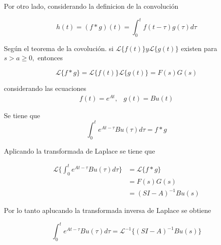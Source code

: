 Por otro lado, considerando la definicion de la convolución

\[
    h(t)=(f*g)(t) = \int_{0}^{t} f(t-\tau)g(\tau)d\tau 
\]

Según el teorema de la covolución. si \( \mathcal{L} \{ f(t) \} y \mathcal{L} \{g(t)\} \) existen para \( s>a\geq 0, \) entonces

\[
    \mathcal{L} \{f* g\} = \mathcal{L} \{ f(t) \} \mathcal{L} \{ g(t) \}=F(s)G(s)
\]

considerando las ecuaciones 
\[
    \begin{matrix}
        f(t)=e^{At}, & g(t)=Bu(t)
    \end{matrix}
\]

Se tiene que 
\[
    \int_{0}^{t} e^{At-\tau} Bu(\tau)d\tau = f*g
\]

Aplicando la transformada de Laplace se tiene que

\[
    \begin{split}
        \mathcal{L} \Big\{ \int_{0}^{t} e^{At-\tau} Bu(\tau)d\tau \Big\} & =\mathcal{L} \Big\{ f*g \Big\}\\
        & = F(s)G(s)\\
        & = (SI-A)^{-1}Bu(s)
    \end{split}
\]

Por lo tanto aplucando la transformada inversa de Laplace se obtiene

\[
    \int_{0}^{t} e^{At-\tau} Bu(\tau)d\tau = \mathcal{L}^{-1} \Big\{ (SI-A)^{-1}Bu(s) \Big\}
\]
